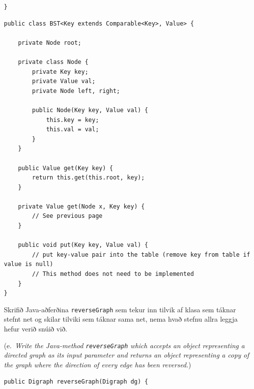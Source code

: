 \documentclass[addpoints]{exam}
\newcommand{\eng}[1]{(e.\ \emph{#1})}
\begin{document}
\begin{questions}
\begin{verbatim}
}
\end{verbatim}

\newpage

\begin{verbatim}
public class BST<Key extends Comparable<Key>, Value> {

    private Node root;

    private class Node {
        private Key key;
        private Value val;
        private Node left, right;

        public Node(Key key, Value val) {
            this.key = key;
            this.val = val;
        }
    }

    public Value get(Key key) {
        return this.get(this.root, key);
    }

    private Value get(Node x, Key key) {
        // See previous page
    }

    public void put(Key key, Value val) {
        // put key-value pair into the table (remove key from table if value is null)
        // This method does not need to be implemented
    }
}   
\end{verbatim}

\newpage
\question[4] Skrifið Java-aðferðina \texttt{reverseGraph} sem tekur inn tilvik af klasa sem táknar stefnt net og skilar tilviki sem táknar sama net, nema hvað stefnu allra leggja hefur verið snúið við.

\eng{Write the Java-method \texttt{reverseGraph} which accepts an object representing a directed graph as its input parameter and returns an object representing a copy of the graph where the direction of every edge has been reversed.}

\begin{verbatim}
public Digraph reverseGraph(Digraph dg) {
















































\end{verbatim}
\end{questions}
\end{document}
